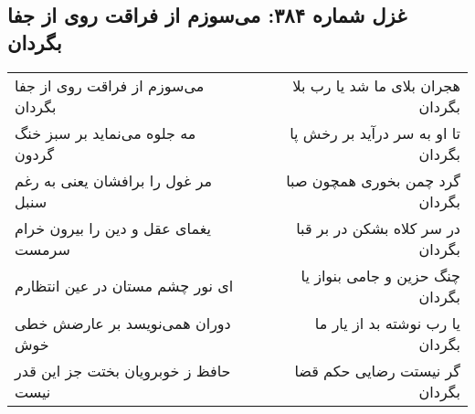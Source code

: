 \begin{center}
\section*{غزل شماره ۳۸۴: می‌سوزم از فراقت روی از جفا بگردان}
\label{sec:sh384}
\begin{longtable}{l p{0.5cm} r}
می‌سوزم از فراقت روی از جفا بگردان
&&
هجران بلای ما شد یا رب بلا بگردان
\\
مه جلوه می‌نماید بر سبز خنگ گردون
&&
تا او به سر درآید بر رخش پا بگردان
\\
مر غول را برافشان یعنی به رغم سنبل
&&
گرد چمن بخوری همچون صبا بگردان
\\
یغمای عقل و دین را بیرون خرام سرمست
&&
در سر کلاه بشکن در بر قبا بگردان
\\
ای نور چشم مستان در عین انتظارم
&&
چنگ حزین و جامی بنواز یا بگردان
\\
دوران همی‌نویسد بر عارضش خطی خوش
&&
یا رب نوشته بد از یار ما بگردان
\\
حافظ ز خوبرویان بختت جز این قدر نیست
&&
گر نیستت رضایی حکم قضا بگردان
\\
\end{longtable}
\end{center}
